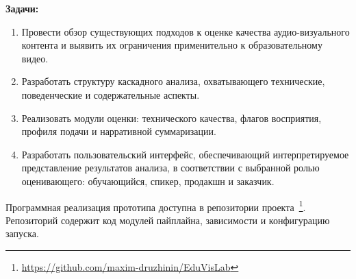 \textbf{Задачи:}
\begin{enumerate}
\item Провести обзор существующих подходов к оценке качества аудио-\nobreak\hspace{0pt}визуального контента и выявить их ограничения применительно к образовательному видео.
\item Разработать структуру каскадного анализа, охватывающего технические, поведенческие и содержательные аспекты.
\item Реализовать модули оценки: технического качества, флагов восприятия, профиля подачи и нарративной суммаризации.
\item Разработать пользовательский интерфейс, обеспечивающий интерпретируемое представление результатов анализа, 
в соответствии с выбранной ролью оценивающего: обучающийся, спикер, продакшн и заказчик.
\end{enumerate}

Программная реализация прототипа доступна в репозитории проекта~\footnote{\url{https://github.com/maxim-druzhinin/EduVisLab}}.
Репозиторий содержит код модулей пайплайна, зависимости и конфигурацию запуска. 